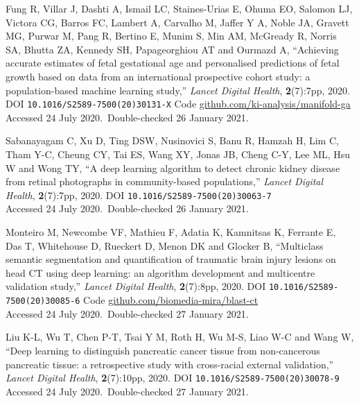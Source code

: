 \vbox{
Fung R,  Villar J,  Dashti A,  Ismail LC,  Staines-Urias E,  Ohuma EO,  Salomon LJ,  Victora CG,  Barros FC,  Lambert A,  Carvalho M,  Jaffer Y A,  Noble JA,  Gravett MG,  Purwar M,  Pang R,  Bertino E,  Munim S,  Min AM,  McGready R,  Norris SA,  Bhutta ZA,  Kennedy SH,  Papageorghiou AT and  Ourmazd A, ``Achieving accurate estimates of fetal gestational age and personalised predictions of fetal growth based on data from an international prospective cohort study: a population-based machine learning study,'' \emph{Lancet Digital Health}, \textbf{2}(7):7pp, 2020. DOI \texttt{10.1016/S2589-7500(20)30131-X} {Code \url{github.com/ki-analysis/manifold-ga}}\\\hfill{Accessed 24 July 2020.}\ {Double-checked 26 January 2021}.}\bibskip

\vbox{
Sabanayagam C,  Xu D,  Ting DSW,  Nusinovici S,  Banu R,  Hamzah H,  Lim C,  Tham Y-C,  Cheung CY,  Tai ES,  Wang XY,  Jonas JB,   Cheng C-Y,  Lee ML,  Hsu W and  Wong TY, ``A deep learning algorithm to detect chronic kidney disease from retinal photographs in community-based populations,'' \emph{Lancet Digital Health}, \textbf{2}(7):7pp, 2020. DOI \texttt{10.1016/S2589-7500(20)30063-7}\\\hfill{Accessed 24 July 2020.}\ {Double-checked 26 January 2021}.}\bibskip

\vbox{
Monteiro M,  Newcombe VF,  Mathieu F,  Adatia K,  Kamnitsas K,  Ferrante E,  Das T,  Whitehouse D,  Rueckert D,  Menon DK and  Glocker B, ``Multiclass semantic segmentation and quantification of traumatic brain injury lesions on head CT using deep learning: an algorithm development and multicentre validation study,'' \emph{Lancet Digital Health}, \textbf{2}(7):8pp, 2020. DOI \texttt{10.1016/S2589-7500(20)30085-6} {Code \url{github.com/biomedia-mira/blast-ct}}\\\hfill{Accessed 24 July 2020.}\ {Double-checked 27 January 2021}.}\bibskip

\vbox{
Liu K-L,  Wu T,  Chen P-T,  Tsai Y M,  Roth H,  Wu M-S,  Liao W-C and  Wang W, ``Deep learning to distinguish pancreatic cancer tissue from non-cancerous pancreatic tissue: a retrospective study with cross-racial external validation,'' \emph{Lancet Digital Health}, \textbf{2}(7):10pp, 2020. DOI \texttt{10.1016/S2589-7500(20)30078-9}\\\hfill{Accessed 24 July 2020.}\ {Double-checked 27 January 2021}.}\bibskip

